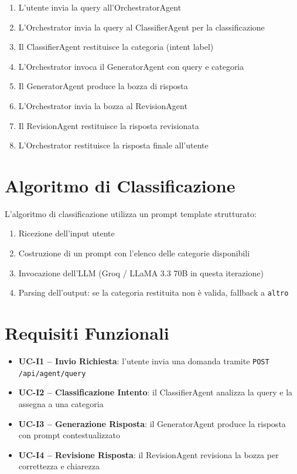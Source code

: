 \documentclass[a4paper,12pt]{report}
\begin{document}
\begin{enumerate}
    \item L'utente invia la query all'OrchestratorAgent
    \item L'Orchestrator invia la query al ClassifierAgent per la classificazione
    \item Il ClassifierAgent restituisce la categoria (intent label)
    \item L'Orchestrator invoca il GeneratorAgent con query e categoria
    \item Il GeneratorAgent produce la bozza di risposta
    \item L'Orchestrator invia la bozza al RevisionAgent
    \item Il RevisionAgent restituisce la risposta revisionata
    \item L'Orchestrator restituisce la risposta finale all'utente
\end{enumerate}

\section{Algoritmo di Classificazione}

L'algoritmo di classificazione utilizza un prompt template strutturato:
\begin{enumerate}
    \item Ricezione dell'input utente
    \item Costruzione di un prompt con l'elenco delle categorie disponibili
    \item Invocazione dell'LLM (Groq / LLaMA 3.3 70B in questa iterazione)
    \item Parsing dell'output: se la categoria restituita non è valida, fallback a \texttt{altro}
\end{enumerate}

\section{Requisiti Funzionali}

\begin{itemize}
    \item \textbf{UC-I1 -- Invio Richiesta}: l'utente invia una domanda tramite \texttt{POST /api/agent/query}
    \item \textbf{UC-I2 -- Classificazione Intento}: il ClassifierAgent analizza la query e la assegna a una categoria
    \item \textbf{UC-I3 -- Generazione Risposta}: il GeneratorAgent produce la risposta con prompt contestualizzato
    \item \textbf{UC-I4 -- Revisione Risposta}: il RevisionAgent revisiona la bozza per correttezza e chiarezza
\end{itemize}
\end{document}
